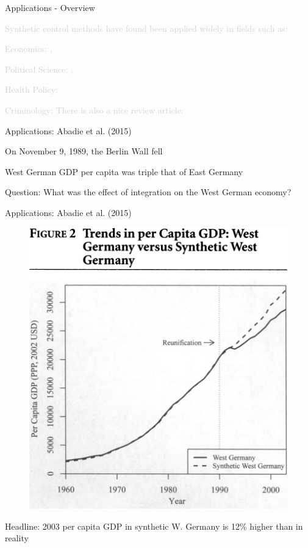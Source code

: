 \documentclass[notes,11pt, aspectratio=169]{beamer}
\newenvironment{wideitemize}{\itemize\addtolength{\itemsep}{10pt}}{\enditemize}
\begin{document}
\begin{frame}{Applications - Overview}

    \textcolor{lightgray}{Synthetic control methods have found been applied widely
    in fields such as:} \\ \medskip
    \begin{wideitemize}
        \item \textcolor{lightgray}{Economics: \cite{gautier_terrorism_2009} \cite{billmeier_assessing_2013}, \cite{cavallo_catastrophic_2013}}
        \item \textcolor{lightgray}{Political Science: \cite{abadie_synthetic_2010},} \textbf{\cite{abadie_comparative_2015}}
        \item \textcolor{lightgray}{Health Policy: \cite{kreif_examination_2016} \cite{li_removing_2021}}
        \item \textcolor{lightgray}{Criminology: \cite{saunders_synthetic_2015}}
    \end{wideitemize}
    \medskip
    \textcolor{lightgray}{There is also a nice review article: \cite{abadie_using_2021} }
\end{frame}

\begin{frame}{Applications: Abadie et al. (2015)}

    \begin{wideitemize}
        \item On November 9, 1989, the Berlin Wall fell
        \item West German GDP per capita was triple that of East Germany
        \item Question: What was the effect of integration on the West German economy? 
    \end{wideitemize}   

\end{frame}

\begin{frame}{Applications: Abadie et al. (2015)}
    \begin{figure}
    \centering
        \includegraphics[width = .4\linewidth]{figures/adh2015.png}
        \label{fig:abadie2015}
    \end{figure}
    
    \small Headline: 2003 per capita GDP in synthetic W. Germany is 12\% higher than in reality
\end{frame}
\end{document}
